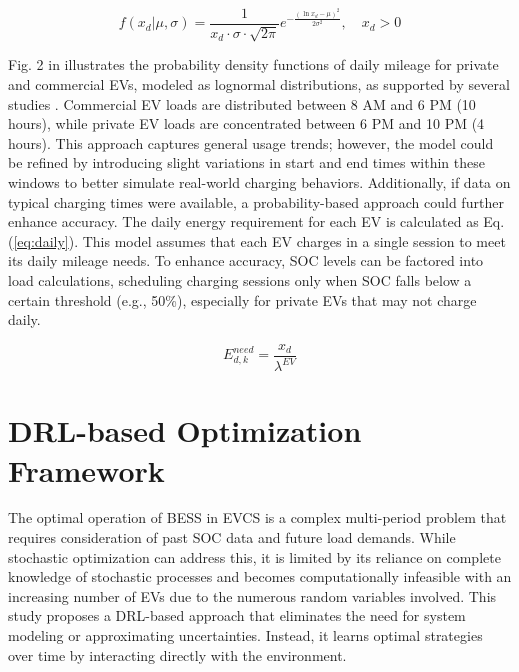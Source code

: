 \documentclass[10pt, journal]{IEEEtran}
\begin{document}
\vspace{-3mm}
{\small
\begin{equation}
\label{eq:Norm}
f(x_{d} | \mu, \sigma) = \frac{1}{x_{d} \cdot \sigma \cdot \sqrt{2\pi}} e^{-\frac{(\ln x_{d} - \mu)^2}{2\sigma^2}}, \quad x_{d} > 0
\end{equation}}

Fig. 2 in \cite{Github_repository} illustrates the probability density functions of daily mileage for private and commercial EVs, modeled as lognormal distributions, as supported by several studies \cite{hussain2020optimal}. Commercial EV loads are distributed between 8 AM and 6 PM (10 hours), while private EV loads are concentrated between 6 PM and 10 PM (4 hours). This approach captures general usage trends; however, the model could be refined by introducing slight variations in start and end times within these windows to better simulate real-world charging behaviors. Additionally, if data on typical charging times were available, a probability-based approach could further enhance accuracy. The daily energy requirement for each EV is calculated as Eq. (\ref{eq:daily}). This model assumes that each EV charges in a single session to meet its daily mileage needs. To enhance accuracy, SOC levels can be factored into load calculations, scheduling charging sessions only when SOC falls below a certain threshold (e.g., 50\%), especially for private EVs that may not charge daily.

\vspace{-3mm}
{\small
\begin{equation}
\label{eq:daily}
    E_{d,k}^{need}= \frac{x_{d}}{\lambda^{EV}}
\end{equation}}

\vspace{-4mm}
\section{DRL-based Optimization Framework}
\vspace{-2mm}
The optimal operation of BESS in EVCS is a complex multi-period problem that requires consideration of past SOC data and future load demands. While stochastic optimization can address this, it is limited by its reliance on complete knowledge of stochastic processes and becomes computationally infeasible with an increasing number of EVs due to the numerous random variables involved. This study proposes a DRL-based approach that eliminates the need for system modeling or approximating uncertainties. Instead, it learns optimal strategies over time by interacting directly with the environment.
\vspace{-1mm}
\end{document}
